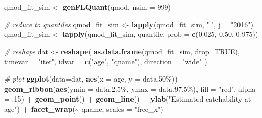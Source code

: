 \documentclass[
]{book}
\newenvironment{Shaded}{\begin{snugshade}}{\end{snugshade}}
\newcommand{\AttributeTok}[1]{\textcolor[rgb]{0.13,0.29,0.53}{#1}}
\newcommand{\CommentTok}[1]{\textcolor[rgb]{0.56,0.35,0.01}{\textit{#1}}}
\newcommand{\ConstantTok}[1]{\textcolor[rgb]{0.56,0.35,0.01}{#1}}
\newcommand{\DecValTok}[1]{\textcolor[rgb]{0.00,0.00,0.81}{#1}}
\newcommand{\FloatTok}[1]{\textcolor[rgb]{0.00,0.00,0.81}{#1}}
\newcommand{\FunctionTok}[1]{\textcolor[rgb]{0.13,0.29,0.53}{\textbf{#1}}}
\newcommand{\NormalTok}[1]{#1}
\newcommand{\OtherTok}[1]{\textcolor[rgb]{0.56,0.35,0.01}{#1}}
\newcommand{\SpecialCharTok}[1]{\textcolor[rgb]{0.81,0.36,0.00}{\textbf{#1}}}
\newcommand{\StringTok}[1]{\textcolor[rgb]{0.31,0.60,0.02}{#1}}
\begin{document}
\begin{Shaded}
\begin{Highlighting}[]
\NormalTok{qmod\_fit\_sim }\OtherTok{\textless{}{-}} \FunctionTok{genFLQuant}\NormalTok{(qmod, }\AttributeTok{nsim =} \DecValTok{999}\NormalTok{)}

\CommentTok{\# reduce to quantiles}
\NormalTok{qmod\_fit\_sim }\OtherTok{\textless{}{-}} \FunctionTok{lapply}\NormalTok{(qmod\_fit\_sim, }\StringTok{"["}\NormalTok{, }\AttributeTok{j =} \StringTok{"2016"}\NormalTok{)}
\NormalTok{qmod\_fit\_sim }\OtherTok{\textless{}{-}} \FunctionTok{lapply}\NormalTok{(qmod\_fit\_sim, quantile, }\AttributeTok{prob =} \FunctionTok{c}\NormalTok{(}\FloatTok{0.025}\NormalTok{, }\FloatTok{0.50}\NormalTok{, }\FloatTok{0.975}\NormalTok{))}

\CommentTok{\# reshape}
\NormalTok{dat }\OtherTok{\textless{}{-}} \FunctionTok{reshape}\NormalTok{(}
    \FunctionTok{as.data.frame}\NormalTok{(qmod\_fit\_sim, }\AttributeTok{drop=}\ConstantTok{TRUE}\NormalTok{), }
    \AttributeTok{timevar =} \StringTok{"iter"}\NormalTok{, }\AttributeTok{idvar =} \FunctionTok{c}\NormalTok{(}\StringTok{"age"}\NormalTok{, }\StringTok{"qname"}\NormalTok{), }\AttributeTok{direction =} \StringTok{"wide"}  
\NormalTok{  )}

\CommentTok{\# plot}
\FunctionTok{ggplot}\NormalTok{(}\AttributeTok{data=}\NormalTok{dat, }\FunctionTok{aes}\NormalTok{(}\AttributeTok{x =}\NormalTok{ age, }\AttributeTok{y =} \StringTok{\textasciigrave{}}\AttributeTok{data.50\%}\StringTok{\textasciigrave{}}\NormalTok{)) }\SpecialCharTok{+}
  \FunctionTok{geom\_ribbon}\NormalTok{(}\FunctionTok{aes}\NormalTok{(}\AttributeTok{ymin =} \StringTok{\textasciigrave{}}\AttributeTok{data.2.5\%}\StringTok{\textasciigrave{}}\NormalTok{, }\AttributeTok{ymax =} \StringTok{\textasciigrave{}}\AttributeTok{data.97.5\%}\StringTok{\textasciigrave{}}\NormalTok{), }
              \AttributeTok{fill =} \StringTok{"red"}\NormalTok{, }\AttributeTok{alpha =}\NormalTok{ .}\DecValTok{15}\NormalTok{) }\SpecialCharTok{+}
  \FunctionTok{geom\_point}\NormalTok{() }\SpecialCharTok{+} \FunctionTok{geom\_line}\NormalTok{() }\SpecialCharTok{+} 
  \FunctionTok{ylab}\NormalTok{(}\StringTok{"Estimated catchability at age"}\NormalTok{) }\SpecialCharTok{+}
  \FunctionTok{facet\_wrap}\NormalTok{(}\SpecialCharTok{\textasciitilde{}}\NormalTok{ qname, }\AttributeTok{scales =} \StringTok{"free\_x"}\NormalTok{)}
\end{Highlighting}
\end{Shaded}
\end{document}
